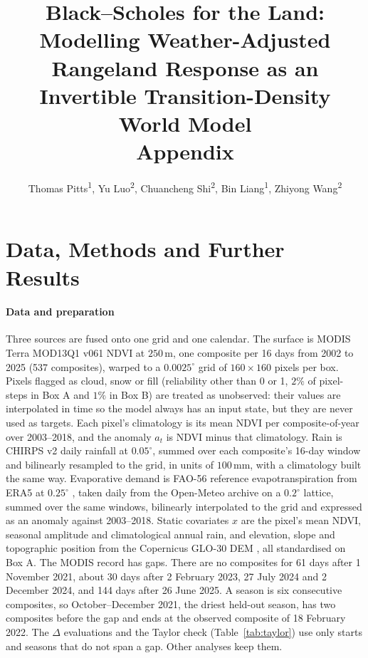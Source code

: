 \documentclass[letterpaper]{article} %
\title{Black--Scholes for the Land:\\ Modelling Weather-Adjusted Rangeland Response as an Invertible Transition-Density World Model\\ Appendix}
\author{
    Thomas Pitts\textsuperscript{\rm 1},
    Yu Luo\textsuperscript{\rm 2},
    Chuancheng Shi\textsuperscript{\rm 2},
    Bin Liang\textsuperscript{\rm 1},
    Zhiyong Wang\textsuperscript{\rm 2}
}
\begin{document}
\maketitle

\section{Data, Methods and Further Results}
\paragraph{Data and preparation} Three sources are fused onto one grid and one calendar. The surface is MODIS Terra MOD13Q1 v061 NDVI \citep{mod13} at $250$\,m, one composite per 16 days from 2002 to 2025 (537 composites), warped to a $0.0025^\circ$ grid of $160\times160$ pixels per box. Pixels flagged as cloud, snow or fill (reliability other than 0 or 1, $2\%$ of pixel-steps in Box A and $1\%$ in Box B) are treated as unobserved: their values are interpolated in time so the model always has an input state, but they are never used as targets. Each pixel's climatology is its mean NDVI per composite-of-year over 2003--2018, and the anomaly $a_t$ is NDVI minus that climatology. Rain is CHIRPS v2 daily rainfall \citep{chirps} at $0.05^\circ$, summed over each composite's 16-day window and bilinearly resampled to the grid, in units of $100$\,mm, with a climatology built the same way. Evaporative demand is FAO-56 reference evapotranspiration \citep{allen1998} from ERA5 at $0.25^\circ$ \citep{hersbach2020}, taken daily from the Open-Meteo archive on a $0.2^\circ$ lattice, summed over the same windows, bilinearly interpolated to the grid and expressed as an anomaly against 2003--2018. Static covariates $x$ are the pixel's mean NDVI, seasonal amplitude and climatological annual rain, and elevation, slope and topographic position from the Copernicus GLO-30 DEM \citep{copdem}, all standardised on Box A. The MODIS record has gaps. There are no composites for 61 days after 1 November 2021, about 30 days after 2 February 2023, 27 July 2024 and 2 December 2024, and 144 days after 26 June 2025. A season is six consecutive composites, so October--December 2021, the driest held-out season, has two composites before the gap and ends at the observed composite of 18 February 2022. The $\Delta$ evaluations and the Taylor check (Table~\ref{tab:taylor}) use only starts and seasons that do not span a gap. Other analyses keep them.
\end{document}
